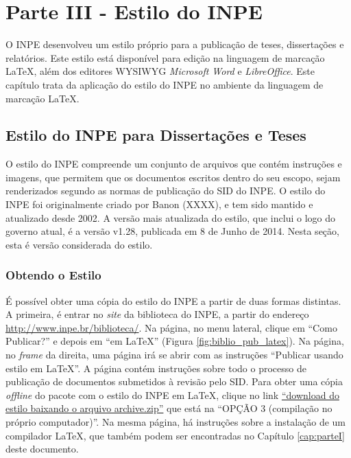 \chapter{Parte III - Estilo do INPE}
\label{cap:parteIII}

O INPE desenvolveu um estilo próprio para a publicação de teses, dissertações e relatórios. Este estilo está disponível para edição na linguagem de marcação LaTeX, além dos editores WYSIWYG \textit{Microsoft Word} e \textit{LibreOffice}. Este capítulo trata da aplicação do estilo do INPE no ambiente da linguagem de marcação LaTeX.

\section{Estilo do INPE para Dissertações e Teses}

O estilo do INPE compreende um conjunto de arquivos que contém instruções e imagens, que permitem que os documentos escritos dentro do seu escopo, sejam renderizados segundo as normas de publicação do SID do INPE. O estilo do INPE foi originalmente criado por Banon (XXXX), e tem sido mantido e atualizado desde 2002. A versão mais atualizada do estilo, que inclui o logo do governo atual, é a versão v1.28, publicada em 8 de Junho de 2014. Nesta seção, esta é versão considerada do estilo.

\subsection*{Obtendo o Estilo}
\label{sec:obter}

É possível obter uma cópia do estilo do INPE a partir de duas formas distintas. A primeira, é entrar no \textit{site} da biblioteca do INPE, a partir do endereço \url{http://www.inpe.br/biblioteca/}. Na página, no menu lateral, clique em ``Como Publicar?'' e depois em ``em LaTeX'' (Figura \ref{fig:biblio_pub_latex}). Na página, no \textit{frame} da direita, uma página irá se abrir com as instruções ``Publicar usando estilo em LaTeX''. A página contém instruções sobre todo o processo de publicação de documentos submetidos à revisão pelo SID. Para obter uma cópia \textit{offline} do pacote com o estilo do INPE em LaTeX, clique no link \href{http://mtc-m16c.sid.inpe.br/archive.cgi/sid.inpe.br/iris@1905/2005/08.25.14.01}{``download do estilo baixando o arquivo archive.zip''} que está na ``OPÇÃO 3 (compilação no próprio computador)''. Na mesma página, há instruções sobre a instalação de um compilador LaTeX, que também podem ser encontradas no Capítulo \ref{cap:parteI} deste documento.

